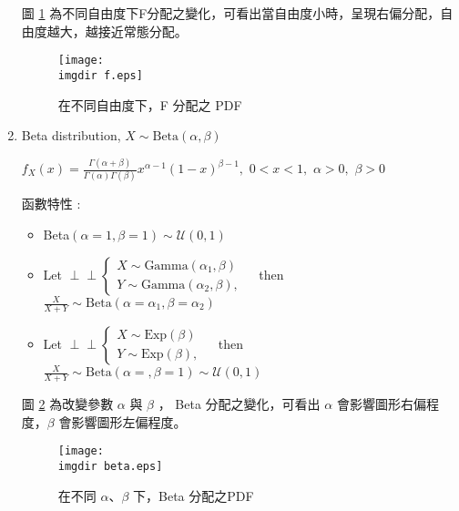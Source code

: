 \begin{enumerate}
圖 \ref{fig:f} 為不同自由度下F分配之變化，可看出當自由度小時，呈現右偏分配，自由度越大，越接近常態分配。

\begin{figure}[H]
    \centering
        \texttt{[image: \\imgdir f.eps]}
    \caption{在不同自由度下，F 分配之 PDF}
    \label{fig:f}
\end{figure}
\item
Beta distribution, $X \sim \text{Beta}(\alpha, \beta)$
\vspace{0.2cm}

$\displaystyle f_X(x) = \frac{\Gamma(\alpha + \beta)}{\Gamma(\alpha)\Gamma(\beta)}x^{\alpha - 1}(1 - x)^{\beta - 1},\,\, 0 < x < 1,\,\,\alpha > 0, \,\,\beta > 0$
\vspace{0.2cm}

函數特性 : 
\begin{itemize}
\item
Beta$(\alpha = 1, \beta = 1) \sim \mathcal{U}(0, 1)$
\item
Let $\!\perp\!\!\!\perp 
\left\{\begin{array}{ll} 
X \sim \text{Gamma}(\alpha_1, \beta) &\\ 
Y \sim \text{Gamma}(\alpha_2, \beta), &
\end{array}\right.$ then $\displaystyle \frac{X}{X + Y} \sim \text{Beta}(\alpha = \alpha_1, \beta = \alpha_2)$ 
\item
Let $\!\perp\!\!\!\perp 
\left\{\begin{array}{ll} 
X \sim \text{Exp}(\beta) &\\ 
Y \sim \text{Exp}(\beta), &
\end{array}\right.$ then $\displaystyle \frac{X}{X + Y} \sim \text{Beta}(\alpha = , \beta = 1)\sim \mathcal{U}(0, 1)$ 
\bigskip
\end{itemize}

圖 \ref{fig:beta} 為改變參數 $\alpha$ 與 $\beta$ ， Beta 分配之變化，可看出 $\alpha$ 會影響圖形右偏程度，$\beta$ 會影響圖形左偏程度。
\vspace{-0.2cm}
\begin{figure}[H]
    \centering
        \texttt{[image: \\imgdir beta.eps]}
    \caption{在不同 $\alpha$、$\beta$ 下，Beta 分配之PDF}
    \label{fig:beta}
\end{figure}
\end{enumerate}

